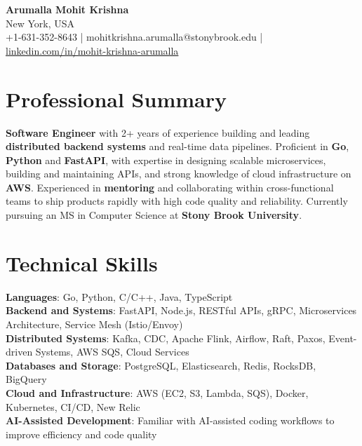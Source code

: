 \documentclass[letterpaper,11pt]{article}
\begin{document}
\begin{center}
  {\Large \textbf{Arumalla Mohit Krishna}} \\
  New York, USA \\
  +1-631-352-8643 \enspace | \enspace mohitkrishna.arumalla@stonybrook.edu \enspace | \enspace \href{https://www.linkedin.com/in/mohit-krishna-arumalla}{linkedin.com/in/mohit-krishna-arumalla}
\end{center}

\section{Professional Summary}
  \begin{itemize}[leftmargin=0.15in, label={}]
    \small{\item{
     \textbf{Software Engineer} with 2+ years of experience building and leading \textbf{distributed backend systems} and real-time data pipelines. Proficient in \textbf{Go}, \textbf{Python} and \textbf{FastAPI}, with expertise in designing scalable microservices, building and maintaining APIs, and strong knowledge of cloud infrastructure on \textbf{AWS}. Experienced in \textbf{mentoring} and collaborating within cross-functional teams to ship products rapidly with high code quality and reliability. Currently pursuing an MS in Computer Science at \textbf{Stony Brook University}.
    }}
  \end{itemize}
\vspace{-16pt}

\section{Technical Skills}
 \begin{itemize}[leftmargin=0.15in, label={}]
    \small{\item{
     \textbf{Languages}: Go, Python, C/C++, Java, TypeScript \\
     \textbf{Backend and Systems}: FastAPI, Node.js, RESTful APIs, gRPC, Microservices Architecture, Service Mesh (Istio/Envoy) \\
     \textbf{Distributed Systems}: Kafka, CDC, Apache Flink, Airflow, Raft, Paxos, Event-driven Systems, AWS SQS, Cloud Services \\
     \textbf{Databases and Storage}: PostgreSQL, Elasticsearch, Redis, RocksDB, BigQuery \\
     \textbf{Cloud and Infrastructure}: AWS (EC2, S3, Lambda, SQS), Docker, Kubernetes, CI/CD, New Relic \\
     \textbf{AI-Assisted Development}: Familiar with AI-assisted coding workflows to improve efficiency and code quality
    }}
 \end{itemize}
\vspace{-16pt}
\end{document}
